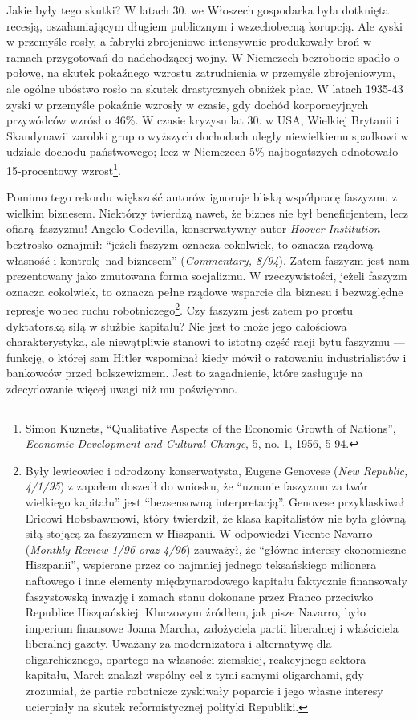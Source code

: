 \documentclass[12pt]{book}
\begin{document}
Jakie były tego skutki? W latach 30. we Włoszech gospodarka była dotknięta recesją, oszałamiającym długiem publicznym i wszechobecną korupcją. Ale zyski w przemyśle rosły, a fabryki zbrojeniowe intensywnie produkowały broń w ramach przygotowań do nadchodzącej wojny. W Niemczech bezrobocie spadło o połowę, na skutek pokaźnego wzrostu zatrudnienia w przemyśle zbrojeniowym, ale ogólne ubóstwo rosło na skutek drastycznych obniżek płac. W latach 1935-43 zyski w przemyśle pokaźnie wzrosły w czasie, gdy dochód korporacyjnych przywódców wzrósł o 46\%. W czasie kryzysu lat 30. w USA, Wielkiej Brytanii i Skandynawii zarobki grup o wyższych dochodach uległy niewielkiemu spadkowi w udziale dochodu państwowego; lecz w Niemczech 5\% najbogatszych odnotowało 15-procentowy wzrost\footnote{Simon Kuznets, ``Qualitative Aspects of the Economic Growth of Nations'', \textit{Economic Development and Cultural Change}, 5, no. 1, 1956, 5-94.}.

Pomimo tego rekordu większość autorów ignoruje bliską współpracę faszyzmu z wielkim biznesem. Niektórzy twierdzą nawet, że biznes nie był beneficjentem, lecz ofiarą faszyzmu! Angelo Codevilla, konserwatywny autor \textit{Hoover Institution} beztrosko oznajmił: ``jeżeli faszyzm oznacza cokolwiek, to oznacza rządową własność i kontrolę nad biznesem'' (\textit{Commentary, 8/94}). Zatem faszyzm jest nam prezentowany jako zmutowana forma socjalizmu. W rzeczywistości, jeżeli faszyzm oznacza cokolwiek, to oznacza pełne rządowe wsparcie dla biznesu i bezwzględne represje wobec ruchu robotniczego\footnote{Były lewicowiec i odrodzony konserwatysta, Eugene Genovese (\textit{New Republic, 4/1/95}) z zapałem doszedł do wniosku, że ``uznanie faszyzmu za twór wielkiego kapitału'' jest ``bezsensowną interpretacją''. Genovese przyklaskiwał Ericowi Hobsbawmowi, który twierdził, że klasa kapitalistów nie była główną siłą stojącą za faszyzmem w Hiszpanii. W odpowiedzi Vicente Navarro (\textit{Monthly Review 1/96 oraz 4/96}) zauważył, że ``główne interesy ekonomiczne Hiszpanii'', wspierane przez co najmniej jednego teksańskiego milionera naftowego i inne elementy międzynarodowego kapitału faktycznie finansowały faszystowską inwazję i zamach stanu dokonane przez Franco przeciwko Republice Hiszpańskiej. Kluczowym źródłem, jak pisze Navarro, było imperium finansowe Joana Marcha, założyciela partii liberalnej i właściciela liberalnej gazety. Uważany za modernizatora i alternatywę dla oligarchicznego, opartego na własności ziemskiej, reakcyjnego sektora kapitału, March znalazł wspólny cel z tymi samymi oligarchami, gdy zrozumiał, że partie robotnicze zyskiwały poparcie i jego własne interesy ucierpiały na skutek reformistycznej polityki Republiki.}. Czy faszyzm jest zatem po prostu dyktatorską siłą w służbie kapitału? Nie jest to może jego całościowa charakterystyka, ale niewątpliwie stanowi to istotną część racji bytu faszyzmu — funkcję, o której sam Hitler wspominał kiedy mówił o ratowaniu industrialistów i bankowców przed bolszewizmem. Jest to zagadnienie, które zasługuje na zdecydowanie więcej uwagi niż mu poświęcono.
\end{document}
